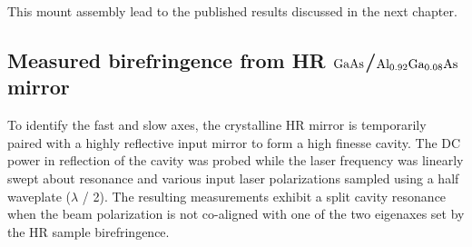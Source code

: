 This mount assembly lead to the published results discussed in the next chapter.

\iffalse
\subsection{Measured birefringence from HR \texorpdfstring{$\mathrm{GaAs}$}{gaas}/\texorpdfstring{$\mathrm{Al_{0.92}Ga_{0.08}As}$}{algaas} mirror}

To identify the fast and slow axes, the crystalline HR mirror is temporarily paired with a highly reflective input mirror to form a high finesse cavity. The DC power in reflection of the cavity was probed while the laser frequency was linearly swept about resonance and various input laser polarizations sampled using a half waveplate ($\lambda$ / 2). The resulting measurements exhibit a split cavity resonance when the beam polarization is not co-aligned with one of the two eigenaxes set by the HR sample birefringence.

